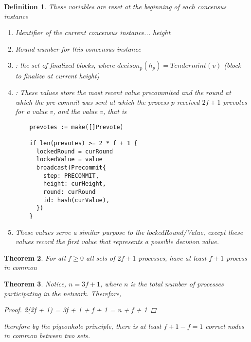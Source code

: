\documentclass{amsart}
\numberwithin{equation}{section}
\theoremstyle{plain}
\newtheorem{thm}{Theorem}[section]
\newtheorem{dfn}[thm]{Definition}
\theoremstyle{definition}
\begin{document}
\begin{dfn}
These variables are reset at the beginning of each concensus instance \\
\begin{enumerate}
  \item[($h_p$)] Identifier of the current concensus instance... height \\ 
  \item[($round_p$)] Round number for this concensus instance \\ 
  \item[($decision_p...$)]: the set of finalized blocks, where $decison_p(h_p) = Tendermint(v)$ (block to finalize at current height)
  \item[($lockedValue / lockedRound$)]: These values store the most recent value precommited and the round at which the pre-commit was sent at which the process $p$ received $2f + 1$ prevotes for a value $v$, and the value $v$, that is 
  \begin{lstlisting} 
    prevotes := make([]Prevote)

    if len(prevotes) >= 2 * f + 1 { 
      lockedRound = curRound
      lockedValue = value
      broadcast(Precommit{
        step: PRECOMMIT,
        height: curHeight,
        round: curRound
        id: hash(curValue),
      })
    }
  \end{lstlisting}
  \item[($validValue / validRound$)] These values serve a similar purpose to the lockedRound/Value, except these values record the first value that represents a possible decision value.\\ 
\end{enumerate}
\end{dfn}

\begin{thm}
  For all $f \geq 0$ all sets of $2f + 1$ processes, have at least $f + 1$ process in common
\end{thm}
\begin{thm}
  Notice, $n = 3f + 1$, where $n$ is the total number of processes participating in the network. Therefore,
  \begin{proof} 
    2(2f + 1) = 3f + 1 + f + 1 = n + f + 1 
  \end{proof}
  therefore by the pigeonhole principle, there is at least $f + 1 - f = 1$ correct nodes in common between two sets.
\end{thm}
\end{document}
